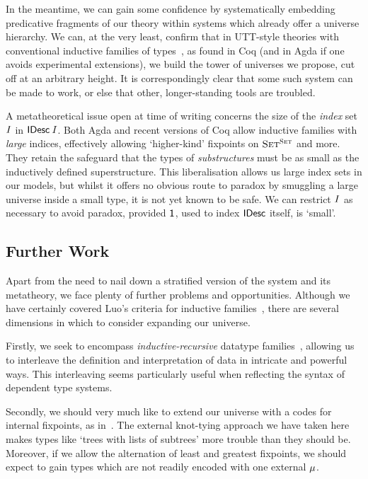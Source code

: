 In the meantime, we can gain some confidence by systematically
embedding predicative fragments of our theory within
systems which already offer a universe hierarchy. We can, at the
very least, confirm that in UTT-style theories with conventional
inductive families of types~\citep{luo:utt}, as found in Coq
(and in Agda if one avoids experimental extensions), we build the
tower of universes we propose, cut off at an arbitrary height.
It is correspondingly clear that some such system can be made to
work, or else that other, longer-standing tools are troubled.

A metatheoretical issue open at time of writing concerns the
size of the \emph{index} set \(\V{I}\) in \(\IDesc{\V{I}}\). Both Agda
and recent versions of Coq allow inductive families with \emph{large}
indices, effectively allowing `higher-kind' fixpoints on
\(\Set^{\Set}\) and more. They retain the safeguard that the types of
\emph{substructures} must be as small as the inductively
defined superstructure. This liberalisation allows us large index sets
in our models, but whilst it offers no obvious route to paradox by
smuggling a large universe inside a small type, it is not yet known
to be safe. We can restrict \(\V{I}\) as necessary to avoid
paradox, provided \(\Unit\), used to index \(\SYMBIDesc\) itself, is
`small'.

\subsection{Further Work}

Apart from the need to nail down a stratified version of the system and
its metatheory, we face plenty of further problems and opportunities.
Although we have certainly covered Luo's criteria for inductive
families~\cite{luo:utt}, there are several dimensions in which to
consider expanding our universe.

Firstly, we seek to encompass
\emph{inductive-recursive} datatype families~\cite{dybjer:iir}, allowing
us to interleave the definition and interpretation of data in intricate
and powerful ways. This interleaving seems particularly useful when
reflecting the syntax of dependent type systems.

Secondly, we should very much like to extend our
universe with a codes for internal fixpoints, as
in~\cite{DBLP:conf/types/MorrisAM04}. The external knot-tying
approach we have taken here makes types like `trees with lists of subtrees'
more trouble than they should be. Moreover, if we allow the alternation
of least and greatest fixpoints, we should expect to gain types which are
not readily encoded with one external \(\SYMBIMu\).

